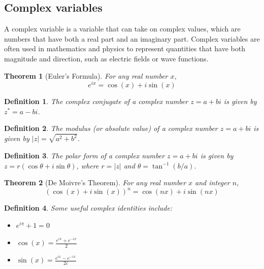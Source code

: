 \documentclass{article}
\newtheorem{theorem}{Theorem}
\newtheorem{definition}{Definition}
\begin{document}
\subsection{Complex variables}
A complex variable is a variable that can take on complex values, which are numbers that have both a real part and an imaginary part. Complex variables are often used in mathematics and physics to represent quantities that have both magnitude and direction, such as electric fields or wave functions.
\begin{theorem}[Euler's Formula]
\label{Euler's formula}
For any real number $x$,
\[e^{ix} = \cos(x) + i\sin(x)\]
\end{theorem}
\begin{definition}
\label{Complex Conjugate}
The complex conjugate of a complex number $z = a + bi$ is given by $z^* = a - bi$.
\end{definition}
\begin{definition}
\label{Modulus of a complex number}
The modulus (or absolute value) of a complex number $z = a + bi$ is given by $|z| = \sqrt{a^2 + b^2}$.
\end{definition}
\begin{definition}
\label{Polar form of a complex number}
The polar form of a complex number $z = a + bi$ is given by $z = r(\cos\theta + i\sin\theta)$, where $r = |z|$ and $\theta = \tan^{-1}(b/a)$.
\end{definition}
\begin{theorem}[De Moivre's Theorem]
\label{De Moivre's Theorem}
For any real number $x$ and integer $n$,
\[(\cos(x) + i\sin(x))^n = \cos(nx) + i\sin(nx)\]
\end{theorem}
\begin{definition}
\label{complex identities}
Some useful complex identities include:
\begin{itemize}
    \item $e^{i\pi} + 1 = 0$
    \item $\cos(x) = \frac{e^{ix} + e^{-ix}}{2}$
    \item $\sin(x) = \frac{e^{ix} - e^{-ix}}{2i}$
\end{itemize}
\end{definition}
\end{document}
